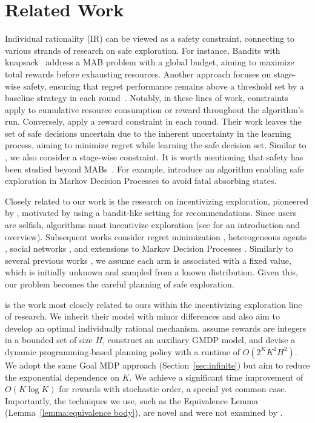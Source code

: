 \section{Related Work}
\label{subsec:related}
Individual rationality (IR) can be viewed as a safety constraint, connecting to various strands of research on safe exploration. For instance, Bandits with knapsack~\cite{badanidiyuru2013bandits} address a MAB problem with a global budget, aiming to maximize total rewards before exhausting resources. Another approach focuses on stage-wise safety, ensuring that regret performance remains above a threshold set by a baseline strategy in each round~\cite{kazerouni2017conservative,wu2016conservative}. Notably, in these lines of work, constraints apply to cumulative resource consumption or reward throughout the algorithm's run. Conversely, \citet{amani2019linear} apply a reward constraint in each round. Their work leaves the set of safe decisions uncertain due to the inherent uncertainty in the learning process, aiming to minimize regret while learning the safe decision set. Similar to \citet{amani2019linear}, we also consider a stage-wise constraint. It is worth mentioning that safety has been studied beyond MABs~\cite{wachi2020safe,Moldovan:2012}. For example, \citet{Moldovan:2012} introduce  an algorithm enabling safe exploration in Markov Decision Processes to avoid fatal absorbing states. 

Closely related to our work is the research on incentivizing exploration, pioneered by \citet{KremerMP13}, motivated by using a bandit-like setting for recommendations. Since users are selfish, algorithms must incentivize exploration (see \cite{slivkins2019introduction} for an introduction and overview). Subsequent works consider regret minimization \cite{mansour2015bayesian,mansour2020bayesian}, heterogeneous agents \cite{chen18a,immorlica2019bayesian}, social networks \citep{Bahar2016,bahar2019recommendation}, and extensions to Markov Decision Processes \cite{simchowitz2024exploration}. Similarly to several previous works \cite{Fiduciary,BaharST19,cohen2019optimal,KremerMP13}, we assume each arm is associated with a fixed value, which is initially unknown and sampled from a known distribution. Given this, our problem becomes the careful planning of safe exploration.

\citet{Fiduciary} is the work most closely related to ours within the incentivizing exploration line of research. We inherit their model with minor differences and also aim to develop an optimal individually rational mechanism. \citet{Fiduciary} assume rewards are integers in a bounded set of size $H$, construct an auxiliary GMDP model, and devise a dynamic programming-based planning policy with a runtime of $O(2^K K^2 H^2)$. We adopt the same Goal MDP approach (Section~\ref{sec:infinite}) but aim to reduce the exponential dependence on $K$. We achieve a significant time improvement of $O(K \log K)$ for rewards with stochastic order, a special yet common case. Importantly, the techniques we use, such as the Equivalence Lemma (Lemma~\ref{lemma:equivalence body}), are novel and were not examined by \citet{Fiduciary}.